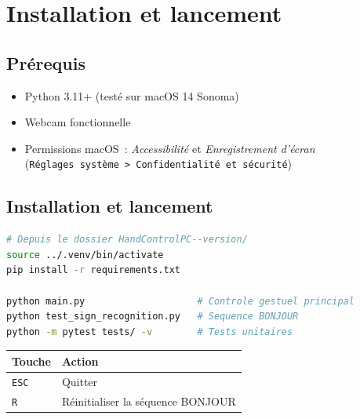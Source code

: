 \documentclass[12pt,a4paper]{article}
\begin{document}
\newpage

\section{Installation et lancement}
\label{sec:install}

\subsection{Pr\'erequis}

\begin{itemize}
  \item Python 3.11+ (test\'e sur macOS 14 Sonoma)
  \item Webcam fonctionnelle
  \item Permissions macOS~: \textit{Accessibilit\'e} et \textit{Enregistrement d'\'ecran}\\
        (\texttt{R\'eglages syst\`eme > Confidentialit\'e et s\'ecurit\'e})
\end{itemize}

\subsection{Installation et lancement}

\begin{lstlisting}[language=bash]
# Depuis le dossier HandControlPC--version/
source ../.venv/bin/activate
pip install -r requirements.txt

python main.py                    # Controle gestuel principal
python test_sign_recognition.py   # Sequence BONJOUR
python -m pytest tests/ -v        # Tests unitaires
\end{lstlisting}

\begin{table}[H]
\centering
\begin{tabular}{ll}
\toprule
\textbf{Touche} & \textbf{Action} \\
\midrule
\texttt{ESC} & Quitter \\
\texttt{R}   & R\'einitialiser la s\'equence BONJOUR \\
\bottomrule
\end{tabular}
\end{table}

\newpage

\end{document}
